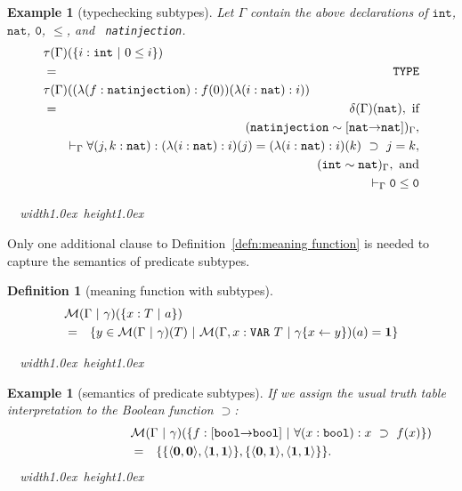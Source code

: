 \documentclass [12pt,twoside]{cslreport}
\newcommand{\thmbox}
   {{\ \hfill\hbox{%
      \vrule width1.0ex height1.0ex
   }\parfillskip 0pt }}
\newtheorem{example}[thm]{Example}
\newcommand{\aro}{\mathord\rightarrow} %
\newcommand{\pair}[1]{\langle #1 \rangle}
\newcommand{\funtype}[2]{[#1 \aro #2]}
\newcommand{\tauGamma}[1]{\tau(\Gamma)(#1)}
\newcommand{\Mgamma}[1]{{\mathcal M}(\Gamma\vbar\gamma)(#1)}
\newcommand{\oneb}{\mathbf{1}}
\newcommand{\zerob}{\mathbf{0}}
\newcommand{\ttbool}{\mathtt{bool}}
\newcommand{\tttype}{\mathtt{TYPE}}
\newcommand{\ttvar}{\mathtt{VAR}}
\newcommand{\ttint}{\mathtt{int}}
\newcommand{\ttnat}{\mathtt{nat}}
\newcommand{\vbar}{\ |\ }
\newenvironment{Eg}[1]{\begin{example}[#1]\label{eg:#1}\em }{\thmbox\end{example}}
\newtheorem{definition}{Definition}
\newenvironment{Defn}[1]{\begin{definition}[#1]\label{defn:#1}}{
\thmbox\end{definition}}
\begin{document}
\begin{Eg}{typechecking subtypes}
Let $\Gamma$ contain the above declarations of $\ttint$, $\ttnat$,
$\mathtt{0}$, 
$\leq$, and {\tt
natinjection}.
\begin{eqnarray*}
\lefteqn{\tauGamma{\{i : \ttint \vbar 0\leq i\}}}\\
  & = & \tttype\\
\lefteqn{\tauGamma{(\lambda (f : \mathtt{ natinjection}) : f(0))(\lambda
(i: \mathtt{nat}): i)}}\\
& = &
\delta(\Gamma)(\ttnat), \mbox{ if}\\& &
( \mathtt{natinjection} \sim \funtype{\ttnat}{\ttnat})_\Gamma,\\& & 
\vdash_\Gamma \forall (j, k : \ttnat): (\lambda (i: \ttnat): i)(j) = (\lambda
(i: \ttnat) : i)(k) \ \supset\  j = k, \\& &
(\ttint \sim \ttnat)_\Gamma, \mbox{ and}\\& & 
\vdash_\Gamma \mathtt{0}\leq \mathtt{0}
\end{eqnarray*}

\end{Eg}

Only one additional clause to Definition~\ref{defn:meaning function} is
needed to capture the 
semantics of predicate subtypes.
\begin{Defn}{meaning function with subtypes}
\begin{eqnarray*}
  \lefteqn{\Mgamma{\{x : T \vbar a\}}}\\
& = & \{ y \in \Mgamma{T} \vbar
\mathcal{M}(\Gamma, x: \ttvar~T\vbar \gamma\{x
\gets y\})(a) = {\oneb} \} 
\end{eqnarray*}
\end{Defn}

\begin{Eg}{semantics of predicate subtypes}
If we assign the usual truth table interpretation to the Boolean function
$\supset$: 
\begin{eqnarray*}
\lefteqn{\Mgamma{\{f : \funtype{\ttbool}{\ttbool} \vbar \forall (x: \ttbool): x\ \supset\ f(x)\}}}\\
& = & \{\{\pair{\zerob, \zerob}, \pair{\oneb, \oneb}\},
\{\pair{\zerob,\oneb}, \pair{\oneb, \oneb}\}\}.
\end{eqnarray*}
\end{Eg}
\end{document}
